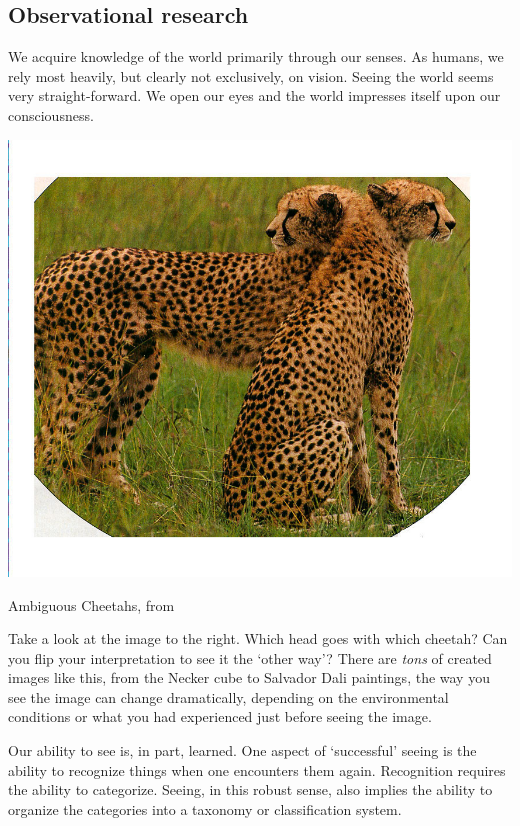 \begin{refsection}
\subsection{Observational research}
\label{observationalresearch}

We acquire knowledge of the world primarily through our senses. As humans, we rely most heavily, but clearly not exclusively, on vision. Seeing the world seems very straight-forward. We open our eyes and the world impresses itself upon our consciousness.
\begin{marginfigure}
 \begin{center}


     \includegraphics[scale=0.50]{../images/AmbigCheeta.jpg}
\end{center}
 \caption{Ambiguous Cheetahs, from  ~\citep{Pitts:2007km}}
\label{fig: ambiguouscheetahs}
\end{marginfigure}

Take a look at the image to the right. Which head goes with which cheetah? Can you flip your interpretation to see it the `other way'? There are \emph{tons} of created images like this, from the Necker cube to Salvador Dali paintings, the way you see the image can change dramatically, depending on the environmental conditions or what you had experienced just before seeing the image.

Our ability to see is, in part, learned. One aspect of `successful' seeing is the ability to recognize things when one encounters them again. Recognition requires the ability to categorize. Seeing, in this robust sense, also implies the ability to organize the categories into a taxonomy or classification system.


\end{refsection}
